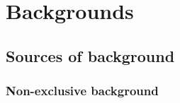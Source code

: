 
\chapter{Backgrounds}\label{chap:backgrounds}

\section{Sources of background}
\subsection{Non-exclusive background}\label{sec:nonExclBkgd}

